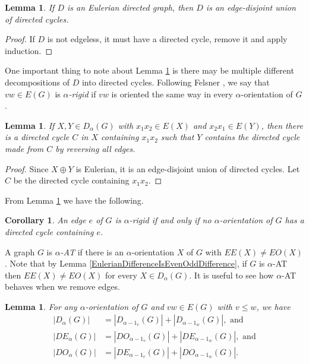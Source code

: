 \documentclass[12pt]{article}
\theoremstyle{plain}
\newtheorem{lem}[thm]{Lemma}
\newtheorem{cor}[thm]{Corollary}
\theoremstyle{definition}
\theoremstyle{remark}
\begin{document}
\begin{lem}\label{EulerianIntoCycles}
	If $D$ is an Eulerian directed graph, then $D$ is an edge-disjoint union of directed cycles.
\end{lem}
\begin{proof}
	If $D$ is not edgeless, it must have a directed cycle, remove it and apply induction.
\end{proof}

One important thing to note about Lemma \ref{EulerianIntoCycles} is there may be multiple different decompositions of $D$ into directed cycles.   Following Felsner \cite{felsner2004lattice}, we say that $vw \in E(G)$ is \emph{$\alpha$-rigid} 
if $vw$ is oriented the same way in every $\alpha$-orientation of $G$.  

\begin{lem}\label{OppCycle}
	If $X, Y \in D_\alpha(G)$ with $x_1x_2 \in E(X)$ and $x_2x_1 \in E(Y)$, then there is a directed cycle $C$ in $X$ containing $x_1x_2$ such that $Y$ contains the directed cycle made from $C$ by reversing all edges.
\end{lem}
\begin{proof}
	Since $X \oplus Y$ is Eulerian, it is an edge-disjoint union of directed cycles.  Let $C$ be the directed cycle containing $x_1x_2$.
\end{proof}

From Lemma \ref{OppCycle} we have the following.

\begin{cor}\label{Rigid}
  An edge $e$ of $G$ is $\alpha$-rigid if and only if no $\alpha$-orientation of $G$ has a directed cycle containing $e$.
\end{cor}

A graph $G$ is \emph{$\alpha$-AT} if there is an $\alpha$-orientation $X$ of $G$ with $EE(X) \ne EO(X)$.  Note that by Lemma \ref{EulerianDifferenceIsEvenOddDifference}, if $G$ is $\alpha$-AT then
$EE(X) \ne EO(X)$ for every $X \in D_\alpha(G)$.  It is useful to see how $\alpha$-AT behaves when we remove edges.

\begin{lem}\label{EdgeRemovalBreakdown}
	For any $\alpha$-orientation of $G$ and $vw \in E(G)$ with $v \le w$, we have
\begin{align*}
|D_\alpha(G)| &= |D_{\alpha - 1_v}(G)| + |D_{\alpha - 1_w}(G)|, \text{ and} \\
|DE_\alpha(G)| &= |DO_{\alpha - 1_v}(G)| + |DE_{\alpha - 1_w}(G)|, \text{ and} \\
|DO_\alpha(G)| &= |DE_{\alpha - 1_v}(G)| + |DO_{\alpha - 1_w}(G)|.
\end{align*}
	
\end{lem}
\end{document}
